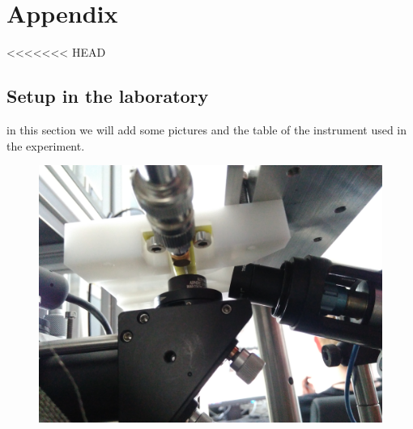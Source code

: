 \section{Appendix}
<<<<<<< HEAD

\subsection{Setup in the laboratory}
in this section we will add some pictures and the table of the instrument used in the experiment.
\begin{figure}
	\centering
	\includegraphics[width=0.7\linewidth]{../figures/IMG_20180530_153552}
	\caption{}
	\label{fig:img20180530153552}
\end{figure}

